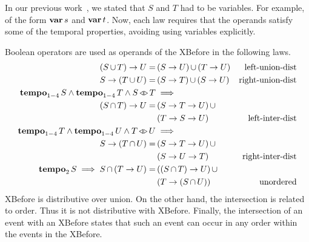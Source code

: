 \documentclass[12pt,openright,twoside,a4paper,oldfontcommands,english,brazil,draft]{abntex2}
\theoremstyle{theo}
\def\varop{\ensuremath\operatorname{\mathbf{var}}}
\newcommand{\var}[1]{\ensuremath\varop #1}
\def\xbeforeop{\ensuremath\rightarrow}
\newcommand{\xbefore}[2]{\ensuremath #1 \xbeforeop #2 }
\def\tempoop{\ensuremath\operatorname{\mathbf{tempo}}}
\newcommand{\tempo}[2][1-4]{\ensuremath\tempoop_{#1} #2}
\def\independenteventsop{\ensuremath\operatorname{\triangleleft\triangleright}}
\newcommand{\independentevents}[2]{\ensuremath #1 \independenteventsop #2}
\newcommand{\parsin}[1]{\ensuremath\left( #1 \right)}
\def\union{\ensuremath\operatorname{\cup}}
\def\inter{\ensuremath\operatorname{\cap}}
\begin{document}
In our previous work~\cite{DM2015}, we stated that $S$ and $T$ had to be variables.
For example, of the form $\var{s}$ and $\var{t}$.
Now, each law requires that the operands satisfy some of the temporal properties, avoiding using variables explicitly.

Boolean operators are used as operands of the XBefore in the following laws.
%
\begin{subequations}
\begin{align}
\xbefore{\left(S \union T\right)}{U} =&
  \parsin{\xbefore{S}{U}} \union \parsin{\xbefore{T}{U}} &
  \text{left-union-dist}
  \label{thm:xbefore-sup-1}\\
%
\xbefore{S}{\left(T \union U\right)} =&
  \parsin{\xbefore{S}{T}} \union \parsin{\xbefore{S}{U}} &
  \text{right-union-dist}
  \label{thm:xbefore-sup-2}\\
%
\tempo{S} \land \tempo{T} \land \independentevents{S}{T} & \implies\nonumber \\
  \xbefore{\left(S \inter T\right)}{U} =&
  \parsin{\xbefore{\xbefore{S}{T}}{U}} \union \nonumber\\
  &\parsin{\xbefore{\xbefore{T}{S}}{U}} &
  \text{left-inter-dist}
  \label{thm:xbefore-inf-1}\\
%
\tempo{T} \land \tempo{U} \land \independentevents{T}{U} & \implies \nonumber\\
  \xbefore{S}{\left(T \inter U\right)} =&
  \parsin{\xbefore{S}{\xbefore{T}{U}}} \union \nonumber\\
  &\parsin{\xbefore{S}{\xbefore{U}{T}}} &
  \text{right-inter-dist}
  \label{thm:xbefore-inf-2}\\
%
\tempo[2]{S} \implies S \inter \parsin{\xbefore{T}{U}} =&
  \parsin{\xbefore{\parsin{S \inter T}}{U}} \union \nonumber\\
  &\parsin{\xbefore{T}{\parsin{S \inter U}}} &
  \text{unordered}
  \label{thm:and_xbefore_equiv_or_xbefore}
\end{align}
\end{subequations}
%
XBefore is distributive over union.
On the other hand, the intersection is related to order.
Thus it is not distributive with XBefore.
Finally, the intersection of an event with an XBefore states that such an event can occur in any order within the events in the XBefore.
\end{document}
